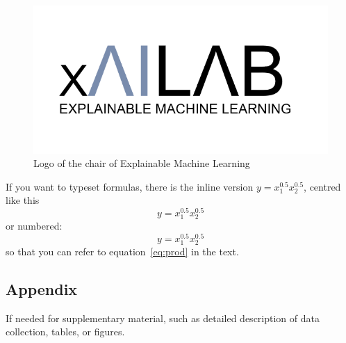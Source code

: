 \documentclass{xai-thesis}
\begin{document}
\begin{figure}[ht]
  \centering
   \includegraphics[width=.5\textwidth]{xaiLogo.png}
  \caption{Logo of the chair of Explainable Machine Learning}   
  \label{fig:xai_logo}
\end{figure}  

If you want to typeset formulas, there is the inline version $ y = x_1^{0.5} x_2^{0.5}$, centred like this
\[
y = x_1^{0.5} x_2^{0.5}
\]
or numbered:
\begin{equation}\label{eq:prod}
y = x_1^{0.5} x_2^{0.5}	
\end{equation}
so that you can refer to equation~\ref{eq:prod} in the text.


\clearpage
\begin{appendix}
	\section{Appendix}
	If needed for supplementary material, such as detailed description of data collection, tables, or figures.
	
\end{appendix}

\clearpage
\renewcommand\refname{Bibliography}



\clearpage
\makeThesisDeclaration
\end{document}
